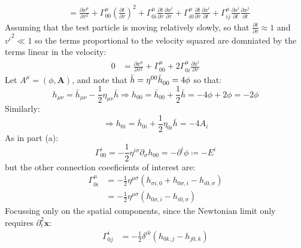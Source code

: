 \documentclass[12pt,a4]{article}
\begin{document}
\begin{enumerate}
\begin{enumerate}
\begin{align*}
            &= \frac{\partial x^\mu}{\partial \tau^2} + \Gamma^\mu_{00} \left(\frac{\partial t}{\partial \tau}\right)^2  + \Gamma^\mu_{0i} \frac{\partial t}{\partial \tau} \frac{\partial x^i}{\partial \tau} + \Gamma^\mu_{i0} \frac{\partial t}{\partial \tau} \frac{\partial x^i}{\partial t} +  \Gamma^\mu_{ij} \frac{\partial x^i}{\partial t} \frac{\partial x^j}{\partial t}
        \end{align*}
        Assuming that the test particle is moving relatively slowly, so that $\frac{\partial t}{\partial \tau}\approx 1$ and ${v^i}^2 \ll 1$ so the terms proportional to the velocity squared are domniated by the terms linear in the velocity:
        \begin{align}
          0 &= \frac{\partial x^\mu}{\partial \tau^2} + \Gamma^\mu_{00} + 2\Gamma^\mu_{0i} \frac{\partial x^i}{\partial \tau} \label{eq:secondgeodesic}
        \end{align}
        Let $A^\mu = (\phi,\mathbf{A})$, and note that $\bar{h} = \eta^{00}\tensor{\bar{h}}{_0_0}  = 4 \phi$ so that:
        \begin{equation*}
          h_{\mu \nu} = \bar{h}_{\mu\nu} - \frac{1}{2}\eta_{\mu\nu} \bar{h} \Rightarrow h_{00} = \bar{h}_{00} + \frac{1}{2} \bar{h} = -4 \phi + 2 \phi = -2 \phi
        \end{equation*}
        Similarly:
        \begin{equation*}
          \Rightarrow h_{0i} = \bar{h}_{0i} + \frac{1}{2} \eta_{0i} \bar{h} = -4 A_i
        \end{equation*}
        As in part (a):
        \begin{equation*}
          \Gamma^i_{0 0} = - \frac{1}{2}  \eta^{i \sigma}\partial_\sigma  h_{0 0} =  -\partial^i \phi \coloneqq  -E^i
        \end{equation*}
        but the other connection coeeficients of interest are:
        \begin{align*}
          \Gamma^\mu_{0 i} &= - \frac{1}{2} \eta^{\mu \sigma} (h_{\sigma i, 0} + h_{0 \sigma, i} - h_{i 0, \sigma})\\
                           &= - \frac{1}{2} \eta^{\mu \sigma} (h_{0 \sigma, i} - h_{i 0, \sigma})
        \end{align*}
        Focussing only on the spatial components, since the Newtonian limit only requires $\partial^2_t \mathbf{x}$:
        \begin{align*}
                \Gamma^i_{0 j} &= - \frac{1}{2} \delta^{i k} (h_{0 k, j} - h_{j 0, k}) \\

\end{align*}
\end{enumerate}
\end{enumerate}
\end{document}
